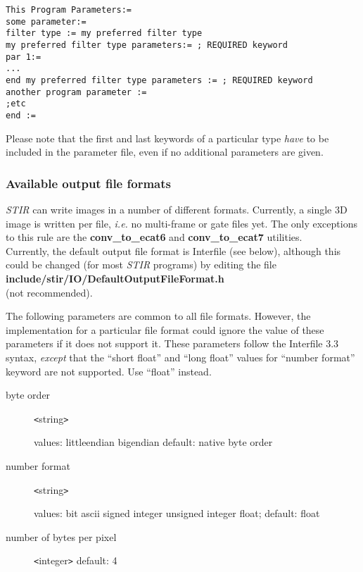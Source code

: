 \documentclass{article}
\begin{document}
\begin{verbatim}
This Program Parameters:=
some parameter:=
filter type := my preferred filter type 
my preferred filter type parameters:= ; REQUIRED keyword 
par 1:= 
... 
end my preferred filter type parameters := ; REQUIRED keyword
another program parameter :=
;etc
end :=
\end{verbatim}


Please note that the first and last keywords of a particular 
type \textit{have} to be included in the parameter file, even if no 
additional parameters are given.


\subsubsection{
Available output file formats}
\label{sec:outputfileformats}

\textit{STIR} can write images in a number of different formats. Currently, 
a single 3D image is written per file, \textit{i.e.} no multi-frame 
or gate files yet. The only exceptions to this rule are the \textbf{conv\_to\_ecat6} 
and \textbf{conv\_to\_ecat7} utilities.\\
Currently, the default output file format is Interfile (see below), 
although this could be changed (for most \textit{STIR} programs) by 
editing the file\\
 \textbf{include/stir/IO/DefaultOutputFileFormat.h}\\ 
(not recommended).

{ 
}
\label{ref:outputcommonparameters}
The following parameters are common to all file formats. However, 
the implementation for a particular file format could ignore 
the value of these parameters if it does not support it. These 
parameters follow the Interfile 3.3 syntax, \textit{except} that the 
``short float'' and ``long float'' values for ``number format'' 
keyword are not supported. Use ``float'' instead.


\begin{description}
\item[byte order] \texttt{<}string\texttt{>}\linebreak
\raggedright
 values: littleendian {\textbar} bigendian\linebreak
 default: native byte order

\item[number format] \texttt{<}string\texttt{>}\linebreak
\raggedright
 values: bit {\textbar} ascii 
{\textbar} signed integer {\textbar} 
 unsigned integer {\textbar} float;\linebreak
default: float
\item[number of bytes per pixel] \texttt{<}integer\texttt{>}\linebreak
 default: 4
\end{description}
\end{document}
